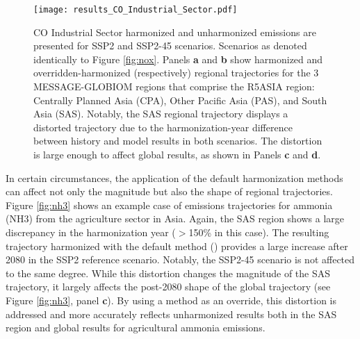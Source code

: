 \begin{figure}
  \begin{center}
    \texttt{[image: results\_CO\_Industrial\_Sector.pdf]}
    \caption[]{
      \label{fig:co}
      CO Industrial Sector harmonized and unharmonized emissions are presented
      for SSP2 and SSP2-45 scenarios. Scenarios as denoted identically to Figure
      \ref{fig:nox}. Panels \textbf{a} and \textbf{b} show harmonized and
      overridden-harmonized (respectively) regional trajectories for the 3
      MESSAGE-GLOBIOM regions that comprise the R5ASIA region: Centrally Planned
      Asia (CPA), Other Pacific Asia (PAS), and South Asia (SAS). Notably, the
      SAS regional trajectory displays a distorted trajectory due to the
      harmonization-year difference between history and model results in both
      scenarios. The distortion is large enough to affect global results, as
      shown in Panels \textbf{c} and \textbf{d}.  
}
  \end{center}
\end{figure}

In certain circumstances, the application of the default harmonization methods
can affect not only the magnitude but also the shape of regional
trajectories. Figure \ref{fig:nh3} shows an example case of emissions
trajectories for ammonia (NH3) from the agriculture sector in Asia. Again, the
SAS region shows a large discrepancy in the harmonization year ($>$150\% in
this case). The resulting trajectory harmonized with the default method
() provides a large increase after 2080 in the SSP2
reference scenario. Notably, the SSP2-45 scenario is not affected to the same
degree. While this distortion changes the magnitude of the SAS trajectory, it
% 
% 
largely affects the post-2080 shape of the global trajectory (see Figure
\ref{fig:nh3}, panel \textbf{c}). By using a  method as an
override, this distortion is addressed and more accurately reflects unharmonized
results both in the SAS region and global results for agricultural ammonia
emissions.

